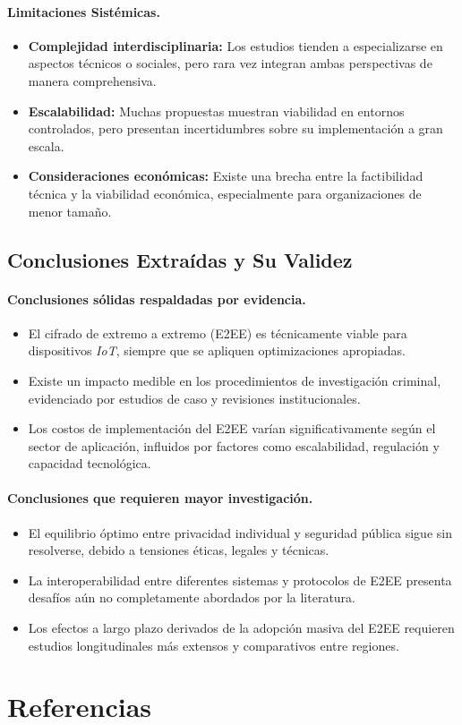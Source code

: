 \documentclass[spanish,12pt,a4paper]{article}
\begin{document}
\begin{multicols}{2}
	\paragraph{Limitaciones Sistémicas.}
	\begin{itemize}
		\item \textbf{Complejidad interdisciplinaria:} Los estudios tienden a especializarse en aspectos técnicos o sociales, pero rara vez integran ambas perspectivas de manera comprehensiva.
		\item \textbf{Escalabilidad:} Muchas propuestas muestran viabilidad en entornos controlados, pero presentan incertidumbres sobre su implementación a gran escala.
		\item \textbf{Consideraciones económicas:} Existe una brecha entre la factibilidad técnica y la viabilidad económica, especialmente para organizaciones de menor tamaño.
	\end{itemize}
	\end{multicols}
	\subsection*{Conclusiones Extraídas y Su Validez}
		\begin{multicols}{2}
	
	\paragraph{Conclusiones sólidas respaldadas por evidencia.}
	\begin{itemize}
		\item El cifrado de extremo a extremo (E2EE) es técnicamente viable para dispositivos \textit{IoT}, siempre que se apliquen optimizaciones apropiadas.
		\item Existe un impacto medible en los procedimientos de investigación criminal, evidenciado por estudios de caso y revisiones institucionales.
		\item Los costos de implementación del E2EE varían significativamente según el sector de aplicación, influidos por factores como escalabilidad, regulación y capacidad tecnológica.
	\end{itemize}
	
	\paragraph{Conclusiones que requieren mayor investigación.}
	\begin{itemize}
		\item El equilibrio óptimo entre privacidad individual y seguridad pública sigue sin resolverse, debido a tensiones éticas, legales y técnicas.
		\item La interoperabilidad entre diferentes sistemas y protocolos de E2EE presenta desafíos aún no completamente abordados por la literatura.
		\item Los efectos a largo plazo derivados de la adopción masiva del E2EE requieren estudios longitudinales más extensos y comparativos entre regiones.
	\end{itemize}
		\end{multicols}
	\section*{Referencias}
	
	\printbibliography
	
\end{document}

